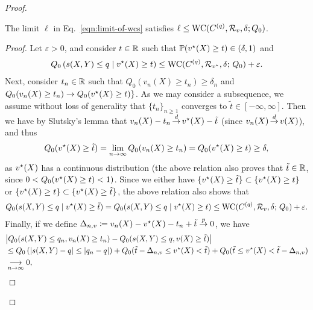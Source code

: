 \begin{proof}
  \begin{claim}
    \label{claim:lower-limit-wcs}
    The limit $\ell$ in Eq.~\eqref{eqn:limit-of-wcs} satisfies
    $\ell \le \textup{WC}(C^{(q)}, \mathcal{R}_v, \delta; Q_0)$.
  \end{claim}
  \begin{proof}
    Let $\varepsilon > 0$, and consider $t \in \mathbb{R}$ such that $\mathbb{P}( v^\star(X) \ge
    t) \in (\delta,1)$ and
    \begin{align*}
      Q_0 \left(  s(X,Y) \le q \mid v^\star(X) \ge t \right)
      \le \textup{WC}(C^{(q)}, \mathcal{R}_{v^\star}, \delta; \, Q_0) + \varepsilon.
    \end{align*}
    Next, consider $t_n \in \mathbb{R}$ such that $Q_0( v_n(X) \ge t_n) \ge \delta_n$ and $Q_0( v_n(X) \ge t_n) \to Q_0( v^\star(X) \ge t) \} $. 
    As we may consider a
    subsequence, we assume without loss of generality that $\{ t_n \}_{n \ge
      1}$ converges to $\tilde{t} \in \left[ - \infty, \infty \right]$.  Then
    we have by Slutsky's lemma that $v_n(X) - t_n \mathop{\stackrel{d}{\rightarrow}} v^\star(X) -
    \tilde{t}$ (since $v_n(X) \mathop{\stackrel{d}{\rightarrow}} v(X)$), and thus
    \begin{align*}
      Q_0( v^\star (X) \ge \tilde{t}) = \lim_{n \to \infty} Q_0(v_n(X) \ge t_n) = Q_0( v^\star(X) \ge t) \ge \delta,
    \end{align*}
    as $v^\star(X)$ has a continuous distribution (the above relation also proves
    that $\tilde{t} \in \mathbb{R}$, since $0 < Q_0( v^\star(X) \ge t) < 1 )$.  Since we
    either have $\{ v^\star(X) \ge \tilde{t} \} \subset \{ v^\star(X) \ge t \}$ or $\{
   v^\star(X) \ge t \} \subset \{ v^\star(X) \ge \tilde{t} \}$, the above relation
    also shows that
    \begin{align*}
      Q_0(  s(X,Y) \le q \mid v^\star(X) \ge \tilde{t}) = Q_0(  s(X,Y) \le q \mid v^\star(X) \ge t) \le  \textup{WC}(C^{(q)}, \mathcal{R}_{v}, \delta; \, Q_0) + \varepsilon.
    \end{align*}
    Finally, if we define $\Delta_{n,v} \coloneqq v_n(X) - v^\star(X) - t_n
    +\tilde{t} \stackrel{p}{\rightarrow} 0$, we have
    \begin{align}
      \label{eqn:cvg-prob-xtvscores}
      \begin{split}
        &\big| Q_0( \score(X,Y) \le q_n,  v_n(X)  \ge t_n) - Q_0( \score(X,Y) \le q,  v(X) \ge \tilde{t}) \big| \\
        &\le Q_0\left( |\score(X,Y) - q| \le |q_n - q| \right) + Q_0(\tilde{t} - \Delta_{n,v} \le v\opt(X)  < \tilde{t}) + Q_0( \tilde{t}  \le v\opt(X)  < \tilde{t} - \Delta_{n,v}) \\
        &\underset{n \to \infty}{\longrightarrow} 0,

\end{split}
\end{align}
\end{proof}
\end{proof}
